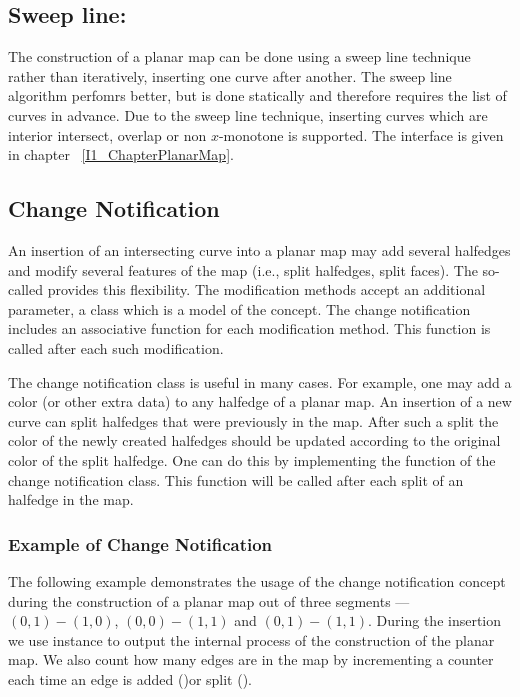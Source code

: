 \subsection*{Sweep line:}
  The construction of a planar map can be done using a sweep line
  technique rather than iteratively, inserting one curve after another.
  The sweep line algorithm perfomrs better, but is done statically and
  therefore requires the list of curves in advance.  Due to the sweep
  line technique, inserting curves which are interior intersect,
  overlap or non $x$-monotone is supported. The interface is given in
  chapter ~\ref{I1_ChapterPlanarMap}.


\begin{ccAdvanced}
\subsection*{Change Notification}
  An insertion of an intersecting curve into a planar map may add
  several halfedges and modify several features of the map (i.e.,
  split halfedges, split faces). The so-called  provides this flexibility. The modification methods
  accept an additional parameter, a class which is a model of the
   concept. The
  change notification includes an associative function for each
  modification method.  This function is called after each such
  modification.

  The change notification class is useful in many cases. For example,
  one may add a color (or other extra data) to any halfedge of a
  planar map. An insertion of a new curve can split halfedges that
  were previously in the map. After such a split the color of the
  newly created halfedges should be updated according to the original
  color of the split halfedge. One can do this by implementing the
   function of the change notification class. This
  function will be called after each split of an halfedge in the map.

\subsubsection{Example of Change Notification}
\label{ssecn:example2}
The following example demonstrates the usage of the change
notification concept during the construction of a
planar map out of three segments --- $(0,1)-(1,0)$, $(0,0)-(1,1)$
and $(0,1)-(1,1)$.
During the insertion we use  instance to
output the internal process of the construction of the planar map.
We also count how many edges are in the map by incrementing a
counter each time an edge is added ()or
split ().


\end{ccAdvanced}
